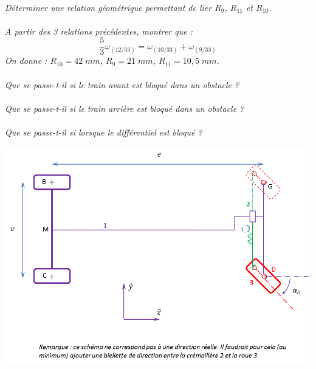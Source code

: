 \documentclass[11pt,oneside]{article}
\begin{document}
\paragraph{}
\textit{Déterminer une relation géométrique permettant de lier $R_{9}$, $R_{11}$ et $R_{10}$.}

\paragraph{}
\textit{A partir des 3 relations précédentes, montrer que : 
$$
\dfrac{5}{3}\omega_{(12/33)} = \omega_{(10/33)}+\omega_{(9/33)}
$$
On donne : $R_{10}=42\;mm$, $R_{9}=21\;mm$, $R_{11}=10,5 \;mm$.}

\paragraph{}
\textit{Que se passe-t-il si le train avant est bloqué dans un obstacle ?}



\paragraph{}
\textit{Que se passe-t-il si le train arrière est bloqué dans un obstacle ?}

\paragraph{}
\textit{Que se passe-t-il si lorsque le différentiel est bloqué ?}

\vspace{2cm}

\begin{center}
\includegraphics[width=.9\textwidth]{png/voiture}
\end{center}
\end{document}
